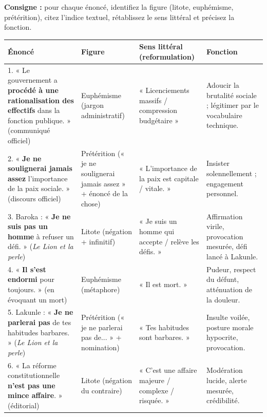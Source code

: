 \documentclass[11pt]{article}
\begin{document}
\begin{experience}
\textbf{Consigne :} pour chaque énoncé, identifiez la figure (litote, euphémisme, prétérition), citez l'indice textuel, rétablissez le sens littéral et précisez la fonction.

\begin{center}
\begin{tabularx}{\linewidth}{|l|X|X|X|}
\hline
\rowcolor{popblueL}\textbf{Énoncé} & \textbf{Figure} & \textbf{Sens littéral (reformulation)} & \textbf{Fonction} \\
\hline
1. « Le gouvernement a \textbf{procédé à une rationalisation des effectifs} dans la fonction publique. » (communiqué officiel) & Euphémisme (jargon administratif) & « Licenciements massifs / compression budgétaire » & Adoucir la brutalité sociale ; légitimer par le vocabulaire technique. \\
\hline
2. « \textbf{Je ne soulignerai jamais assez} l'importance de la paix sociale. » (discours officiel) & Prétérition (« je ne soulignerai jamais assez » + énoncé de la chose) & « L'importance de la paix est capitale / vitale. » & Insister solennellement ; engagement personnel. \\
\hline
3. Baroka : « \textbf{Je ne suis pas un homme} à refuser un défi. » (\emph{Le Lion et la perle}) & Litote (négation + infinitif) & « Je suis un homme qui accepte / relève les défis. » & Affirmation virile, provocation mesurée, défi lancé à Lakunle. \\
\hline
4. « \textbf{Il s'est endormi} pour toujours. » (en évoquant un mort) & Euphémisme (métaphore) & « Il est mort. » & Pudeur, respect du défunt, atténuation de la douleur. \\
\hline
5. Lakunle : « \textbf{Je ne parlerai pas} de tes habitudes barbares. » (\emph{Le Lion et la perle}) & Prétérition (« je ne parlerai pas de... » + nomination) & « Tes habitudes sont barbares. » & Insulte voilée, posture morale hypocrite, provocation. \\
\hline
6. « La réforme constitutionnelle \textbf{n'est pas une mince affaire}. » (éditorial) & Litote (négation du contraire) & « C'est une affaire majeure / complexe / risquée. » & Modération lucide, alerte mesurée, crédibilité. \\
\hline
\end{tabularx}
\end{center}
\end{experience}
\end{document}
